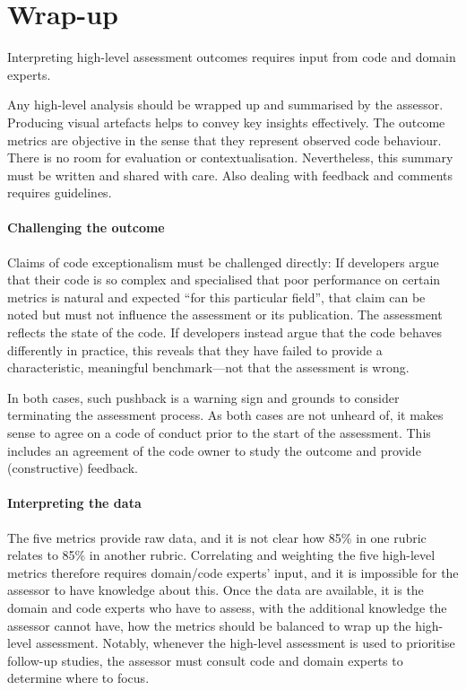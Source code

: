 \section{Wrap-up}
\label{section:high-level:wrap-up}


\begin{summary}
 Interpreting high-level assessment outcomes requires input from code and domain experts.
\end{summary}


Any high-level analysis should be wrapped up and summarised by the assessor. 
Producing visual artefacts helps to convey key insights effectively. 
The outcome metrics are objective in the sense that they represent observed code behaviour.
There is no room for evaluation or contextualisation. 
Nevertheless, this summary must be written and shared with care.
Also dealing with feedback and comments requires guidelines.


\paragraph{Challenging the outcome}

Claims of code exceptionalism must be challenged directly:
If developers argue that their code is so complex and specialised that poor performance on certain metrics is natural and expected ``for this particular field'', that claim can be noted but must not influence the assessment or its publication. 
The assessment reflects the state of the code. 
If developers instead argue that the code behaves differently in practice, this reveals that they have failed to provide a characteristic, meaningful benchmark---not that the assessment is wrong. 


In both cases, such pushback is a warning sign and grounds to consider terminating the assessment process.
As both cases are not unheard of, it makes sense to agree on a code of conduct prior to the start of the assessment.
This includes an agreement of the code owner to study the outcome and provide (constructive) feedback.



\paragraph{Interpreting the data}

The five metrics provide raw data, and it is not clear how 85\% in one rubric relates to 85\% in another rubric.
Correlating and weighting the five high-level metrics therefore requires domain/code experts' input, and it is impossible for the assessor to have knowledge about this.
Once the data are available, it is the domain and code experts who have to assess, with the additional knowledge the assessor cannot have, how the metrics should be balanced to wrap up the high-level assessment.
Notably, whenever the high-level assessment is used to prioritise follow-up studies, the assessor must consult code and domain experts to determine where to focus.

